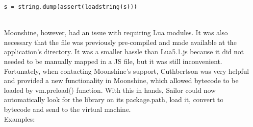 \documentclass{article}
\begin{document}
\begin{lstlisting}[frame=single]
s = string.dump(assert(loadstring(s)))
\end{lstlisting}\\

Moonshine, however, had an issue with requiring Lua modules. It was also necessary that the file was previously pre-compiled and made available at the application's directory. It was a smaller hassle than Lua5.1.js because it did not needed to be manually mapped in a JS file, but it was still inconvenient. Fortunately, when contacting Moonshine's support, Cuthbertson was very helpful and provided a new functionality in Moonshine, which allowed bytecode to be loaded by vm.preload() function. With this in hands, Sailor could now automatically look for the library on its package.path, load it, convert to bytecode and send to the virtual machine.\\

Examples:\\
\end{document}
